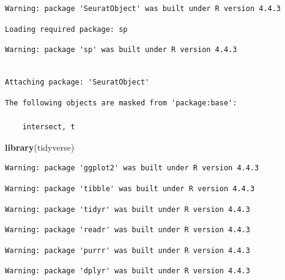 \documentclass[
  landscape]{article}
\newenvironment{Shaded}{\begin{snugshade}}{\end{snugshade}}
\newcommand{\FunctionTok}[1]{\textcolor[rgb]{0.13,0.29,0.53}{\textbf{#1}}}
\newcommand{\NormalTok}[1]{#1}
\begin{document}
\begin{verbatim}
Warning: package 'SeuratObject' was built under R version 4.4.3
\end{verbatim}

\begin{verbatim}
Loading required package: sp
\end{verbatim}

\begin{verbatim}
Warning: package 'sp' was built under R version 4.4.3
\end{verbatim}

\begin{verbatim}

Attaching package: 'SeuratObject'
\end{verbatim}

\begin{verbatim}
The following objects are masked from 'package:base':

    intersect, t
\end{verbatim}

\begin{Shaded}
\begin{Highlighting}[]
\FunctionTok{library}\NormalTok{(tidyverse)}
\end{Highlighting}
\end{Shaded}

\begin{verbatim}
Warning: package 'ggplot2' was built under R version 4.4.3
\end{verbatim}

\begin{verbatim}
Warning: package 'tibble' was built under R version 4.4.3
\end{verbatim}

\begin{verbatim}
Warning: package 'tidyr' was built under R version 4.4.3
\end{verbatim}

\begin{verbatim}
Warning: package 'readr' was built under R version 4.4.3
\end{verbatim}

\begin{verbatim}
Warning: package 'purrr' was built under R version 4.4.3
\end{verbatim}

\begin{verbatim}
Warning: package 'dplyr' was built under R version 4.4.3
\end{verbatim}
\end{document}
